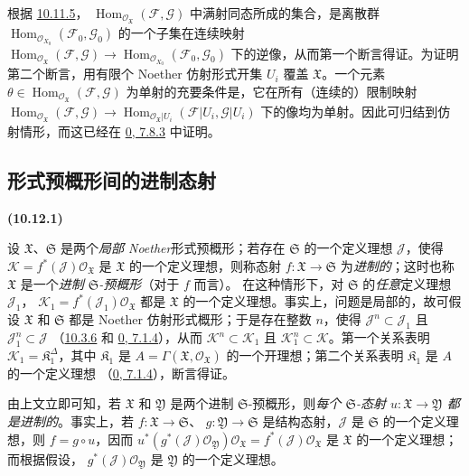 \documentclass[UTF8,fontset=none,11pt,oneside,openany]{ctexbook}
\newenvironment{env}[1][]{%
  \par\medskip\noindent\textbf{(#1)}\ %
}{\par}
\newcommand{\oldpage}[2][]{%
  \hypertarget{ega-source-page-#1-#2}{}%
  \marginnote{\scriptsize\textbf{#1}~|~#2}\ignorespaces}
\let\EGAOriginalLabel\label
\renewcommand{\label}[1]{\phantomsection\EGAOriginalLabel{#1}}
\begin{document}
根据 \hyperref[I.10.11.5-fr]{10.11.5}，
$\operatorname{Hom}_{\mathscr{O}_{\mathfrak{X}}}
(\mathscr{F},\mathscr{G})$ 中满射同态所成的集合，是离散群
$\operatorname{Hom}_{\mathscr{O}_{X_0}}(\mathscr{F}_0,\mathscr{G}_0)$ 的一个子集在连续映射
$\operatorname{Hom}_{\mathscr{O}_{\mathfrak{X}}}
(\mathscr{F},\mathscr{G})\to
\operatorname{Hom}_{\mathscr{O}_{X_0}}(\mathscr{F}_0,\mathscr{G}_0)$ 下的逆像，从而第一个断言得证。为证明第二个断言，用有限个 Noether 仿射形式开集 $U_i$ 覆盖
$\mathfrak{X}$。一个元素
$\theta\in\operatorname{Hom}_{\mathscr{O}_{\mathfrak{X}}}
(\mathscr{F},\mathscr{G})$ 为单射的充要条件是，它在所有（连续的）限制映射
$\operatorname{Hom}_{\mathscr{O}_{\mathfrak{X}}}
(\mathscr{F},\mathscr{G})\to
\operatorname{Hom}_{\mathscr{O}_{\mathfrak{X}}|U_i}
(\mathscr{F}|U_i,\mathscr{G}|U_i)$ 下的像均为单射。因此可归结到仿射情形，而这已经在
\hyperref[0.7.8.3-fr]{0, 7.8.3} 中证明。

\oldpage[I]{206}

\subsection{形式预概形间的进制态射}
\label{subsection:I.10.12-fr}

\begin{env}[10.12.1]
\label{I.10.12.1-fr}
设 $\mathfrak{X}$、$\mathfrak{S}$ 是两个\emph{局部 Noether}形式预概形；若存在
$\mathfrak{S}$ 的一个定义理想 $\mathscr{J}$，使得
$\mathscr{K}=f^*(\mathscr{J})\mathscr{O}_{\mathfrak{X}}$ 是
$\mathfrak{X}$ 的一个定义理想，则称态射
$f:\mathfrak{X}\to\mathfrak{S}$ 为\emph{进制的}；这时也称
$\mathfrak{X}$ 是一个\emph{进制 $\mathfrak{S}$-预概形}（对于 $f$ 而言）。
在这种情形下，对 $\mathfrak{S}$ 的\emph{任意}定义理想 $\mathscr{J}_1$，
$\mathscr{K}_1=f^*(\mathscr{J}_1)\mathscr{O}_{\mathfrak{X}}$ 都是
$\mathfrak{X}$ 的一个定义理想。事实上，问题是局部的，故可假设
$\mathfrak{X}$ 和 $\mathfrak{S}$ 都是 Noether 仿射形式概形；于是存在整数
$n$，使得 $\mathscr{J}^n\subset\mathscr{J}_1$ 且
$\mathscr{J}_1^n\subset\mathscr{J}$
（\hyperref[I.10.3.6-fr]{10.3.6} 和
\hyperref[0.7.1.4-fr]{0, 7.1.4}），从而
$\mathscr{K}^n\subset\mathscr{K}_1$ 且
$\mathscr{K}_1^n\subset\mathscr{K}$。第一个关系表明
$\mathscr{K}_1=\mathfrak{K}_1^\Delta$，其中 $\mathfrak{K}_1$ 是
$A=\Gamma(\mathfrak{X},\mathscr{O}_{\mathfrak{X}})$ 的一个开理想；第二个关系表明
$\mathfrak{K}_1$ 是 $A$ 的一个定义理想
（\hyperref[0.7.1.4-fr]{0, 7.1.4}），断言得证。
\end{env}

由上文立即可知，若 $\mathfrak{X}$ 和 $\mathfrak{Y}$ 是两个进制
$\mathfrak{S}$-预概形，则\emph{每个 $\mathfrak{S}$-态射
$u:\mathfrak{X}\to\mathfrak{Y}$ 都是进制的}。事实上，若
$f:\mathfrak{X}\to\mathfrak{S}$、
$g:\mathfrak{Y}\to\mathfrak{S}$ 是结构态射，$\mathscr{J}$ 是
$\mathfrak{S}$ 的一个定义理想，则 $f=g\circ u$，因而
$u^*(g^*(\mathscr{J})\mathscr{O}_{\mathfrak{Y}})
\mathscr{O}_{\mathfrak{X}}=f^*(\mathscr{J})
\mathscr{O}_{\mathfrak{X}}$ 是 $\mathfrak{X}$ 的一个定义理想；而根据假设，
$g^*(\mathscr{J})\mathscr{O}_{\mathfrak{Y}}$ 是 $\mathfrak{Y}$ 的一个定义理想。
\end{document}

